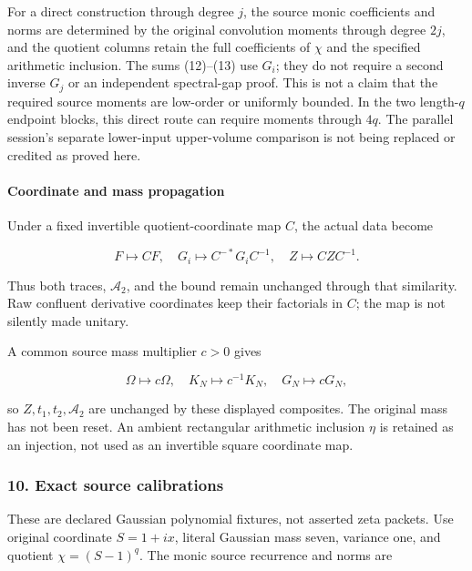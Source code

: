 For a direct construction through degree \(j\), the source monic coefficients and norms are determined by the original convolution moments through degree \(2j\), and the quotient columns retain the full coefficients of \(\chi\) and the specified arithmetic inclusion. The sums (12)--(13) use \(G_i\); they do not require a second inverse \(G_j\) or an independent spectral-gap proof. This is not a claim that the required source moments are low-order or uniformly bounded. In the two length-\(q\) endpoint blocks, this direct route can require moments through \(4q\). The parallel session's separate lower-input upper-volume comparison is not being replaced or credited as proved here.

\paragraph{Coordinate and mass propagation}\label{endpoint-relation_moment_original--coordinate-and-mass-propagation}

Under a fixed invertible quotient-coordinate map \(C\), the actual data become

\[
 F\mapsto CF,\quad G_i\mapsto C^{-*}G_iC^{-1},\quad
 Z\mapsto CZC^{-1}.
\]

Thus both traces, \(\mathcal A_2\), and the bound remain unchanged through that similarity. Raw confluent derivative coordinates keep their factorials in \(C\); the map is not silently made unitary.

A common source mass multiplier \(c>0\) gives

\[
 \Omega\mapsto c\Omega,\quad K_N\mapsto c^{-1}K_N,\quad
 G_N\mapsto cG_N,
\]

so \(Z,t_1,t_2,\mathcal A_2\) are unchanged by these displayed composites. The original mass has not been reset. An ambient rectangular arithmetic inclusion \(\eta\) is retained as an injection, not used as an invertible square coordinate map.

\subsubsection{10. Exact source calibrations}\label{endpoint-relation_moment_original--exact-source-calibrations}

These are declared Gaussian polynomial fixtures, not asserted zeta packets. Use original coordinate \(S=1+ix\), literal Gaussian mass seven, variance one, and quotient \(\chi=(S-1)^q\). The monic source recurrence and norms are

